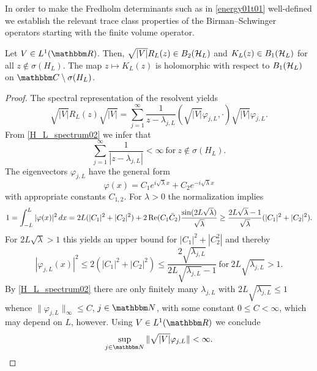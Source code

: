 In order to make the Fredholm determinants such as in \eqref{energy01t01} 
well-defined we establish the relevant trace class properties of the Birman--Schwinger operators 
starting with the finite volume operator. 

\begin{lemma}\label{bso02at}
Let $V\in L^1(\R)$. Then, $\sqrt{|V|}R_L(z)\in B_2({\mathcal H}_L)$ and
$K_L(z)\in B_1({\mathcal H}_L)$ for all $z\notin\sigma(H_L)$. 
The map $z\mapsto K_L(z)$ is holomorphic with respect to $B_1({\mathcal H}_L)$ on $\C\setminus\sigma(H_L)$. 
\end{lemma}
\begin{proof}
The spectral representation of the resolvent yields
\begin{equation}\label{bso02at01}
  \sqrt{|V|}R_L(z)\sqrt{|V|} = 
     \sum_{j=1}^\infty \frac{1}{z-\lambda_{j,L}} (\sqrt{|V|}\varphi_{j,L},\cdot)\sqrt{|V|}\varphi_{j,L}.
\end{equation}
From \eqref{H_L_spectrum02} we infer that
\begin{equation}\label{bso02at02}
  \sum_{j=1}^\infty \frac{1}{|z-\lambda_{j,L}|} < \infty \ \text{for}\ z\notin\sigma(H_L) .
\end{equation}
The eigenvectors $\varphi_{j,L}$ have the general form
\begin{equation*}
  \varphi(x) = C_1 e^{i\sqrt{\lambda}x} + C_2 e^{-i\sqrt{\lambda}x}
\end{equation*}
with appropriate constants $C_{1,2}$. For $\lambda>0$ the normalization implies 
\begin{equation*}
  1  = \int_{-L}^L |\varphi(x)|^2 \, dx
     = 2L ( |C_1|^2 + |C_2|^2 ) + 2\operatorname{Re} (C_1\bar C_2) \frac{\sin(2L\sqrt{\lambda})}{\sqrt{\lambda}} 
     \geq \frac{2L\sqrt{\lambda}-1}{\sqrt{\lambda}} ( |C_1|^2 + |C_2|^2 ).
\end{equation*}
For $2L\sqrt{\lambda}>1$ this yields an upper bound for $|C_1|^2+|C_2^2|$ and thereby
\begin{equation*}
  |\varphi_{j,L}(x)|^2 \leq 2 (|C_1|^2+|C_2|^2) \leq \frac{2\sqrt{\lambda_{j,L}}}{2L\sqrt{\lambda_{j,L}}-1}\ 
     \text{for}\ 2L\sqrt{\lambda_{j,L}} > 1.
\end{equation*}
By \eqref{H_L_spectrum02} there are only finitely many $\lambda_{j,L}$ with $2L\sqrt{\lambda_{j,L}} \leq 1$
whence $\|\varphi_{j,L}\|_\infty\leq C$, $j\in\N$, with some constant $0\leq C<\infty$, which may depend on $L$, however.
Using $V\in L^1(\R)$ we conclude
\begin{equation}\label{bso02at03}
  \sup_{j\in\N} \|\sqrt{|V|}\varphi_{j,L}\| < \infty .

\end{equation}
\end{proof}
